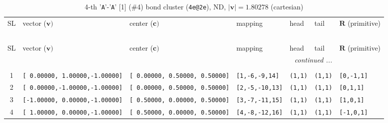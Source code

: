 \documentclass[fleqn,10pt,landscape]{jsarticle}
\begin{document}
\begin{longtable}[l]{cllllll}
\captionsetup{justification=raggedright, singlelinecheck=off}
\caption{4-th '\texttt{A}'-'\texttt{A}' [1] (\#4) bond cluster (\texttt{4e@2e}), ND, $|\bm{v}|=1.80278$ (cartesian)}
 \\
 \hline \hline
SL & vector ($\bm{v})$ & center ($\bm{c})$ & mapping & head & tail & $\bm{R}$ (primitive) \\ \hline \endfirsthead

\multicolumn{6}{l}{\tablename\ \thetable{}} \\
 \hline \hline
SL & vector ($\bm{v})$ & center ($\bm{c})$ & mapping & head & tail & $\bm{R}$ (primitive) \\ \hline \endhead

 \hline \hline
\multicolumn{6}{r}{\footnotesize\it continued ...} \\ \endfoot

 \hline \hline
\multicolumn{6}{r}{} \\ \endlastfoot

1 & \texttt{[ 0.00000, 1.00000,-1.00000]} & \texttt{[ 0.00000, 0.50000, 0.50000]} & \texttt{[1,-6,-9,14]} & \texttt{(1,1)} & \texttt{(1,1)} & \texttt{[0,-1,1]} \\ \hline
2 & \texttt{[ 0.00000,-1.00000,-1.00000]} & \texttt{[ 0.00000, 0.50000, 0.50000]} & \texttt{[2,-5,-10,13]} & \texttt{(1,1)} & \texttt{(1,1)} & \texttt{[0,1,1]} \\ \hline
3 & \texttt{[-1.00000, 0.00000,-1.00000]} & \texttt{[ 0.50000, 0.00000, 0.50000]} & \texttt{[3,-7,-11,15]} & \texttt{(1,1)} & \texttt{(1,1)} & \texttt{[1,0,1]} \\ \hline
4 & \texttt{[ 1.00000, 0.00000,-1.00000]} & \texttt{[ 0.50000, 0.00000, 0.50000]} & \texttt{[4,-8,-12,16]} & \texttt{(1,1)} & \texttt{(1,1)} & \texttt{[-1,0,1]} \\
\end{longtable}
\end{document}
